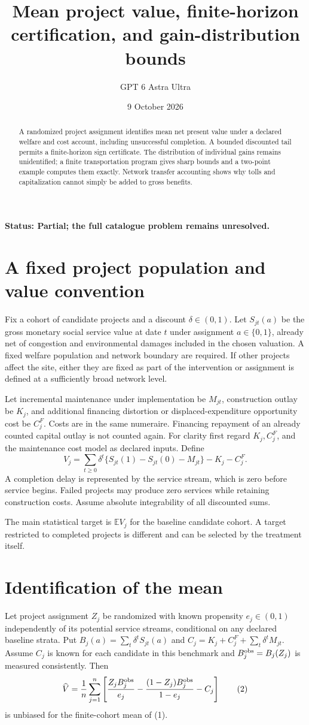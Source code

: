 \documentclass[11pt,a4paper]{article}
\title{Mean project value, finite-horizon certification, and gain-distribution bounds}
\author{GPT 6 Astra Ultra}
\date{9 October 2026}
\newcommand{\E}{\mathbb E}
\begin{document}
\maketitle
\textbf{Status: Partial; the full catalogue problem remains unresolved.}

\begin{abstract}
A randomized project assignment identifies mean net present value under a declared welfare and cost account, including unsuccessful completion. A bounded discounted tail permits a finite-horizon sign certificate. The distribution of individual gains remains unidentified; a finite transportation program gives sharp bounds and a two-point example computes them exactly. Network transfer accounting shows why tolls and capitalization cannot simply be added to gross benefits.
\end{abstract}
\section{A fixed project population and value convention}
Fix a cohort of candidate projects and a discount $\delta\in(0,1)$. Let $S_{jt}(a)$ be the gross monetary social service value at date $t$ under assignment $a\in\{0,1\}$, already net of congestion and environmental damages included in the chosen valuation. A fixed welfare population and network boundary are required. If other projects affect the site, either they are fixed as part of the intervention or assignment is defined at a sufficiently broad network level.

Let incremental maintenance under implementation be $M_{jt}$, construction outlay be $K_j$, and additional financing distortion or displaced-expenditure opportunity cost be $C_j^F$. Costs are in the same numeraire. Financing repayment of an already counted capital outlay is not counted again. For clarity first regard $K_j,C_j^F$, and the maintenance cost model as declared inputs. Define
\[
 V_j=\sum_{t\ge0}\delta^t
       \{S_{jt}(1)-S_{jt}(0)-M_{jt}\}-K_j-C_j^F.
 \tag{1}
\]
A completion delay is represented by the service stream, which is zero before service begins. Failed projects may produce zero services while retaining construction costs. Assume absolute integrability of all discounted sums.

The main statistical target is $\E V_j$ for the baseline candidate cohort. A target restricted to completed projects is different and can be selected by the treatment itself.
\section{Identification of the mean}
Let project assignment $Z_j$ be randomized with known propensity $e_j\in(0,1)$ independently of its potential service streams, conditional on any declared baseline strata. Put
$B_j(a)=\sum_t\delta^tS_{jt}(a)$ and
$C_j=K_j+C_j^F+\sum_t\delta^tM_{jt}$.
Assume $C_j$ is known for each candidate in this benchmark and $B_j^{\rm obs}=B_j(Z_j)$ is measured consistently. Then
\[
 \widehat V=\frac1n\sum_{j=1}^n
 \left[
 \frac{Z_j B_j^{\rm obs}}{e_j}
 -\frac{(1-Z_j)B_j^{\rm obs}}{1-e_j}
 -C_j
 \right]
 \tag{2}
\]
is unbiased for the finite-cohort mean of (1).
\end{document}
